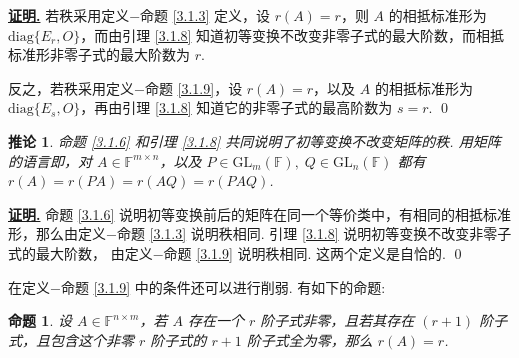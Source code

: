 \documentclass[10pt,openany]{article}
\theoremstyle{thmstyle} %
\theoremstyle{defstyle} %
\newtheorem{corollary}[theorem]{推论}
\theoremstyle{prostyle} %
\newtheorem{proposition}[theorem]{命题}
\theoremstyle{exastyle}
\theoremstyle{remstyle}
\renewenvironment{proof}[1][证明]{\par\underline{\textbf{#1.}} \;\fangsong}{\qed\par}
\newcommand{\F}{\mathbb{F}}
\newcommand{\gfn}{\text{GL}_n(\mathbb{F})}
\newcommand{\gfm}{\text{GL}_m(\mathbb{F})}
\newcommand{\mn}{^{m \times n}}
\newcommand{\nm}{^{n \times m}}
\newcommand{\diag}{\mathrm{diag}}
\begin{document}
\begin{proof}
	若秩采用定义\(-\)命题 \ref{3.1.3} 定义，设 \( r(A)=r \)，则 \( A \) 的相抵标准形为 \( \diag\{E_r,O\} \)，而由引理 \ref{3.1.8} 知道初等变换不改变非零子式的最大阶数，而相抵标准形非零子式的最大阶数为 \( r \). 
	
	反之，若秩采用定义\(-\)命题 \ref{3.1.9}，设 \( r(A)=r \)，以及 \( A \) 的相抵标准形为 \( \diag\{E_s,O\} \)，再由引理 \ref{3.1.8} 知道它的非零子式的最高阶数为 \( s=r \).
\end{proof}

\begin{corollary} \label{3.1.10}
	命题 \ref{3.1.6} 和引理 \ref{3.1.8} 共同说明了初等变换不改变矩阵的秩. 用矩阵的语言即，对 \( A \in \F\mn \)，以及 \( P \in \gfm, \; Q \in \gfn \) 都有 \( r(A)=r(PA)=r(AQ)=r(PAQ) \).
\end{corollary}

\begin{proof}
	命题 \ref{3.1.6} 说明初等变换前后的矩阵在同一个等价类中，有相同的相抵标准形，那么由定义\(-\)命题 \ref{3.1.3} 说明秩相同. 引理 \ref{3.1.8} 说明初等变换不改变非零子式的最大阶数， 由定义\(-\)命题 \ref{3.1.9} 说明秩相同. 这两个定义是自恰的.
\end{proof}

在定义\(-\)命题 \ref{3.1.9} 中的条件还可以进行削弱. 有如下的命题:

\begin{proposition} \label{3.1.11}
	设 \( A \in \F\nm \)，若 \( A \) 存在一个 \( r \) 阶子式非零，且若其存在 \( (r+1) \) 阶子式，且包含这个非零 \( r \) 阶子式的 \( r+1 \) 阶子式全为零，那么 \( r(A)=r \).
\end{proposition}
\end{document}
